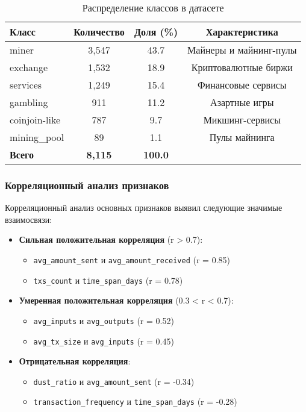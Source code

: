 \begin{table}[h]
\centering
\begin{tabular}{|l|c|c|c|}
\hline
\textbf{Класс} & \textbf{Количество} & \textbf{Доля (\%)} & \textbf{Характеристика} \\
\hline
miner & 3,547 & 43.7 & Майнеры и майнинг-пулы \\
exchange & 1,532 & 18.9 & Криптовалютные биржи \\
services & 1,249 & 15.4 & Финансовые сервисы \\
gambling & 911 & 11.2 & Азартные игры \\
coinjoin-like & 787 & 9.7 & Микшинг-сервисы \\
mining\_pool & 89 & 1.1 & Пулы майнинга \\
\hline
\textbf{Всего} & \textbf{8,115} & \textbf{100.0} & \\
\hline
\end{tabular}
\caption{Распределение классов в датасете}
\label{tab:class_distribution}
\end{table}

\subsubsection{Корреляционный анализ признаков}

Корреляционный анализ основных признаков выявил следующие значимые взаимосвязи:

\begin{itemize}
    \item \textbf{Сильная положительная корреляция} (r > 0.7):
        \begin{itemize}
            \item \texttt{avg\_amount\_sent} и \texttt{avg\_amount\_received} (r = 0.85)
            \item \texttt{txs\_count} и \texttt{time\_span\_days} (r = 0.78)
        \end{itemize}
    \item \textbf{Умеренная положительная корреляция} (0.3 < r < 0.7):
        \begin{itemize}
            \item \texttt{avg\_inputs} и \texttt{avg\_outputs} (r = 0.52)
            \item \texttt{avg\_tx\_size} и \texttt{avg\_inputs} (r = 0.45)
        \end{itemize}
    \item \textbf{Отрицательная корреляция}:
        \begin{itemize}
            \item \texttt{dust\_ratio} и \texttt{avg\_amount\_sent} (r = -0.34)
            \item \texttt{transaction\_frequency} и \texttt{time\_span\_days} (r = -0.28)
        \end{itemize}
\end{itemize}

